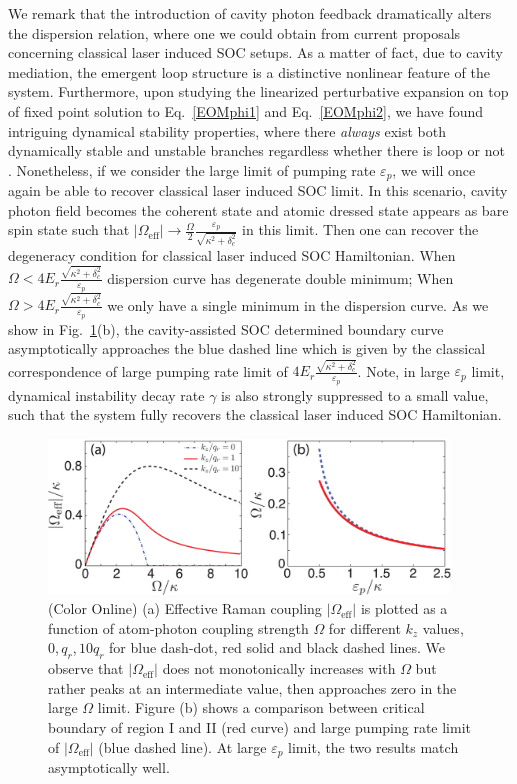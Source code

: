 \documentclass[atoms,article,submit,moreauthors,pdftex,12pt,a4paper]{mdpi}
\begin{document}
We remark that the introduction of cavity photon feedback dramatically alters the dispersion relation, where one we could obtain from current proposals concerning classical laser induced SOC setups. As a matter of fact, due to cavity mediation, the emergent loop structure is a distinctive nonlinear feature of the system. Furthermore, upon studying the linearized perturbative expansion on top of fixed point solution to Eq.~\ref{EOMphi1} and Eq.~\ref{EOMphi2}, we have found intriguing dynamical stability properties, where there {\em always} exist both dynamically stable and unstable branches regardless whether there is loop or not \cite{cavitySOC}. Nonetheless, if we consider the large limit of pumping rate $\varepsilon_p$, we will once again be able to recover classical laser induced SOC limit. In this scenario, cavity photon field becomes the coherent state and atomic dressed state appears as bare spin state such that $|\Omega_\text{eff}|\rightarrow\frac{\Omega}{2}\frac{\varepsilon_p}{\sqrt{\kappa^2+\delta_c^2}}$ in this limit. Then one can recover the degeneracy condition for classical laser induced SOC Hamiltonian. When $\Omega<4E_r\frac{\sqrt{\kappa^2+\delta_c^2}}{\varepsilon_p}$ dispersion curve has degenerate double minimum; When $\Omega>4E_r\frac{\sqrt{\kappa^2+\delta_c^2}}{\varepsilon_p}$ we only have a single minimum in the dispersion curve. As we show in Fig.~\ref{fig2}(b), the cavity-assisted SOC determined boundary curve asymptotically approaches the blue dashed line which is given by the classical correspondence of large pumping rate limit of  $4E_r\frac{\sqrt{\kappa^2+\delta_c^2}}{\varepsilon_p}$. Note, in large $\varepsilon_p$ limit, dynamical instability decay rate $\gamma$ is also strongly suppressed to a small value, such that the system fully recovers the classical laser induced SOC Hamiltonian. 

\begin{figure}[htp]
\includegraphics[width=0.95\textwidth]{fig2}\caption{(Color Online) (a) Effective Raman coupling $|\Omega_\text{eff}|$ is plotted as a function of atom-photon coupling strength $\Omega$ for different $k_z$ values, $0$,\,$q_r$,\,$10q_r$ for blue dash-dot, red solid and black dashed  lines. We observe that $|\Omega_\text{eff}|$ does not monotonically  increases with $\Omega$ but rather peaks at an intermediate value, then approaches zero in the large $\Omega$ limit. Figure (b) shows a comparison between critical boundary of region I and II (red curve) and large pumping rate limit of $|\Omega_\text{eff}|$ (blue dashed line). At large $\varepsilon_p$ limit, the two results match asymptotically well.  }\label{fig2}
\end{figure}
\end{document}
